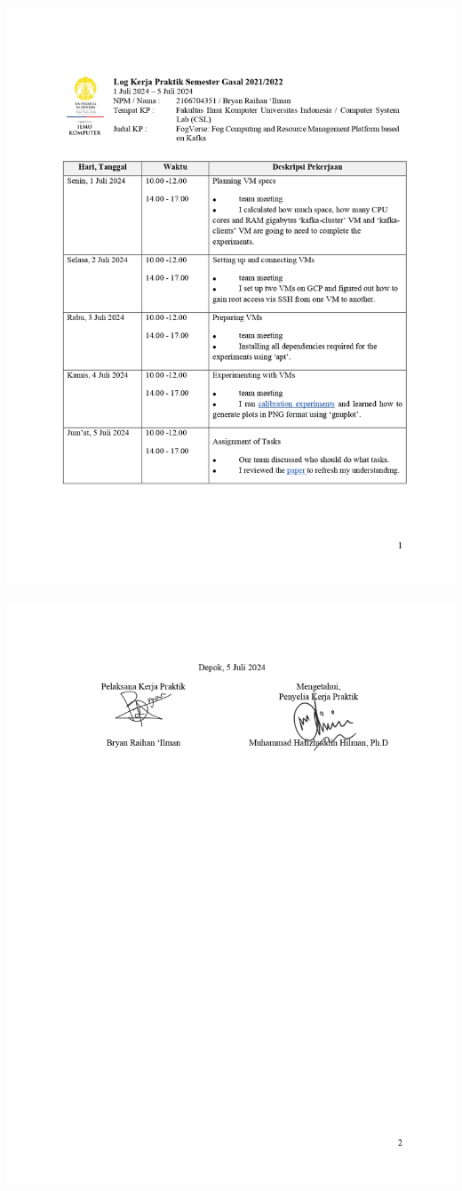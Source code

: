 \includegraphics[width=1\textwidth]{assets/pics/Log-5-CSL-Bryan Raihan Ilman-0001.jpg}

\includegraphics[width=1\textwidth]{assets/pics/Log-5-CSL-Bryan Raihan Ilman-0002.jpg}

